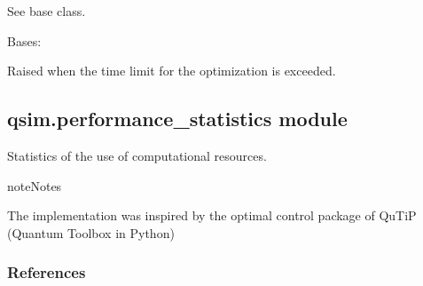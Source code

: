 \documentclass[letterpaper,10pt,english]{sphinxmanual}
\begin{document}
\begin{fulllineitems}
\begin{quote}
\begin{description}
\begin{itemize}
\end{itemize}

\end{description}\end{quote}

\begin{fulllineitems}
\label{\detokenize{qsim:qsim.optimize.SimulatedAnnealingScipy.run_optimization}}
See base class.

\end{fulllineitems}


\end{fulllineitems}


\begin{fulllineitems}
\label{\detokenize{qsim:qsim.optimize.WallTimeExceeded}}
Bases: 

Raised when the time limit for the optimization is exceeded.

\end{fulllineitems}



\subsection{qsim.performance\_statistics module}
\label{\detokenize{qsim:module-qsim.performance_statistics}}\label{\detokenize{qsim:qsim-performance-statistics-module}}
Statistics of the use of computational resources.

\begin{sphinxadmonition}{note}{Notes}

The implementation was inspired by the optimal control package of QuTiP 
(Quantum Toolbox in Python)
\end{sphinxadmonition}
\subsubsection*{References}
\end{document}
